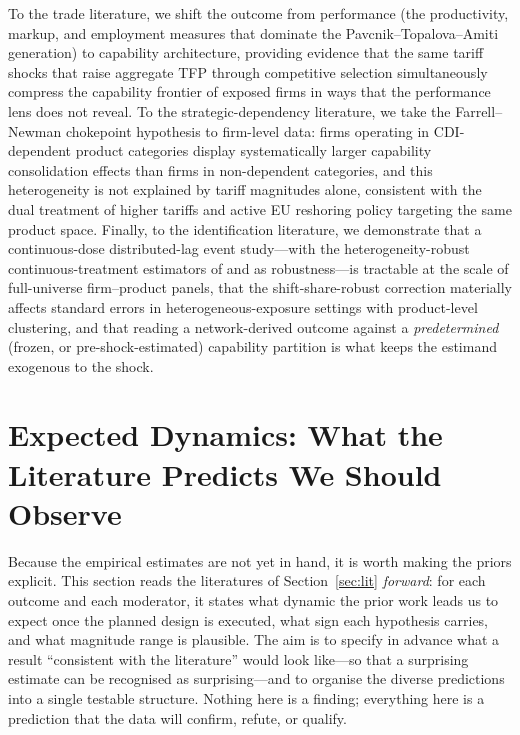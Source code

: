 To the trade literature, we shift the outcome from performance (the productivity,
markup, and employment measures that dominate the Pavcnik--Topalova--Amiti generation) to
capability architecture, providing evidence that the same tariff shocks that raise
aggregate TFP through competitive selection simultaneously compress the capability
frontier of exposed firms in ways that the performance lens does not reveal. To
the strategic-dependency literature, we take the Farrell--Newman chokepoint
hypothesis to firm-level data: firms operating in CDI-dependent product
categories display systematically larger capability consolidation effects than firms
in non-dependent categories, and this heterogeneity is not explained by tariff
magnitudes alone, consistent with the dual treatment of higher tariffs and active
EU reshoring policy targeting the same product space. Finally, to the identification
literature, we demonstrate that a continuous-dose distributed-lag event study---with the
heterogeneity-robust continuous-treatment estimators of \citet{dechaisemartin2020} and
\citet{callawaygoodmanbacon2024} as robustness---is tractable at the scale of
full-universe firm--product panels, that the \citet{adao2019} shift-share-robust
correction materially affects standard errors in heterogeneous-exposure settings with
product-level clustering, and that reading a network-derived outcome against a
\emph{predetermined} (frozen, or pre-shock-estimated) capability partition is what keeps
the estimand exogenous to the shock.

\section{Expected Dynamics: What the Literature Predicts We Should Observe}
\label{sec:expected}

Because the empirical estimates are not yet in hand, it is worth making the priors
explicit. This section reads the literatures of Section~\ref{sec:lit} \emph{forward}:
for each outcome and each moderator, it states what dynamic the prior work leads us to
expect once the planned design is executed, what sign each hypothesis carries, and
what magnitude range is plausible. The aim is to specify in advance what a result
``consistent with the literature'' would look like---so that a surprising estimate can
be recognised as surprising---and to organise the diverse predictions into a single
testable structure. Nothing here is a finding; everything here is a prediction that
the data will confirm, refute, or qualify.

